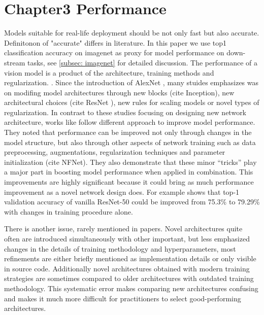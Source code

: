 
\chapter{Chapter3 Performance}

Models suitable for real-life deployment should be not only fast but also accurate. Definitonon of "accurate" differs in literature. In this paper we use top1 classification accuracy on imagenet as proxy for model performance on down-stream tasks, see \ref{subsec: imagenet} for detailed discussion. 
The performance of a vision model is a product of the architecture, training methods and regularization. \cite{lee2020_compounding_improvements}. 
Since the introduction of AlexNet \cite{alexnet??}, many stuides emphasizes was on modifing model architectures through new blocks (cite Inception), new architectural choices (cite ResNet ), new rules for scaling models \cite{tan2019_efficientnet} or novel types of regularization. \cite{mixup} \cite{cutmix}
In contrast to these studies focusing on designing new network architecture, works like \cite{he2019bag_of_tricks} follow different approach to improve model performance. They noted that performance can be improved not only through changes in the model structure, but also through other aspects of network training such as data preprocessing, augmentations, regularization techniques and parameter initialization (cite NFNet). They also demonstrate that these minor “tricks” play a major part in boosting model performance when applied in combination. This improvements are highly significant because it could bring as much performance improvement as a novel network design does. For example \cite{he2019bag_of_tricks} shows that top-1 validation accuracy of vanilla ResNet-50 could be improved from 75.3\% to 79.29\% with changes in training procedure alone. 


There is another issue, rarely mentioned in papers. Novel architectures quite often are introduced simultaneously with other important, but less emphasized changes in the details of training methodology and hyperparameters, most refinements are either briefly mentioned as implementation details or only visible in source code. Additionally novel architectures obtained with modern training strategies are sometimes compared to older architectures with outdated training methodology. This systematic error makes comparing new architectures confusing and makes it much more difficult for practitioners to select good-performing architectures. 

